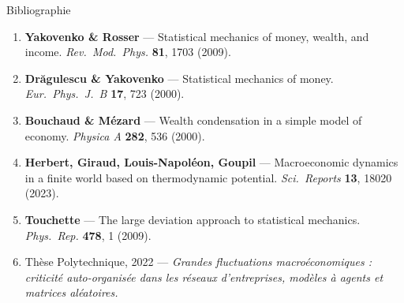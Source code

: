 \documentclass[aspectratio=169]{beamer}
\begin{document}
	\begin{frame}{Bibliographie}
		\footnotesize
		\begin{enumerate}\setlength\itemsep{4pt}
			\item \textbf{Yakovenko \& Rosser} — Statistical mechanics of money,
			wealth, and income. \emph{Rev.\ Mod.\ Phys.} \textbf{81}, 1703 (2009).
			\item \textbf{Drăgulescu \& Yakovenko} — Statistical mechanics of money.
			\emph{Eur.\ Phys.\ J.\ B} \textbf{17}, 723 (2000).
			\item \textbf{Bouchaud \& Mézard} — Wealth condensation in a simple
			model of economy. \emph{Physica A} \textbf{282}, 536 (2000).
			\item \textbf{Herbert, Giraud, Louis-Napoléon, Goupil} — Macroeconomic
			dynamics in a finite world based on thermodynamic potential.
			\emph{Sci.\ Reports} \textbf{13}, 18020 (2023).
			\item \textbf{Touchette} — The large deviation approach to statistical
			mechanics. \emph{Phys.\ Rep.} \textbf{478}, 1 (2009).
			\item Thèse Polytechnique, 2022 — \emph{Grandes fluctuations
				macroéconomiques : criticité auto-organisée dans les réseaux
				d'entreprises, modèles à agents et matrices aléatoires.}
		\end{enumerate}
	\end{frame}
	
\end{document}
